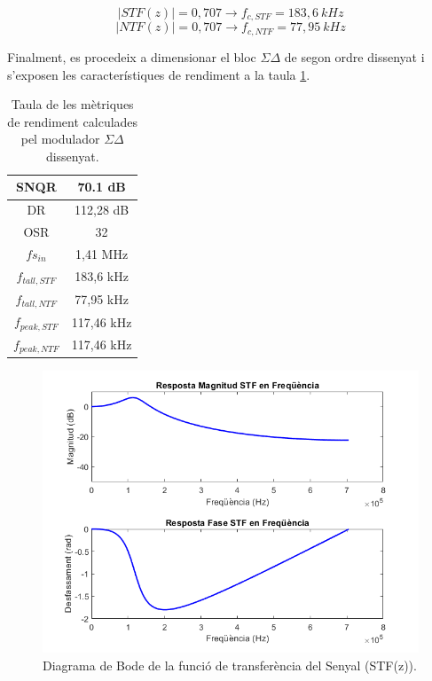 \begin{equation}\label{eq_fcorteSTF}
    \left| STF(z)\right| = 0,707 \longrightarrow f_{c,STF} = 183,6\ kHz
\end{equation}
\begin{equation}\label{eq_fcorteNTF}
    \left| NTF(z)\right| = 0,707 \longrightarrow f_{c,NTF} = 77,95\ kHz
\end{equation}
\par Finalment, es procedeix a dimensionar el bloc $\Sigma \Delta$ de segon ordre dissenyat i s'exposen les característiques de rendiment a la taula \ref{taula_SigmaDelta}. 

\begin{table}[H]
    \centering
    \begin{tabular}{ | c | c | }
    \hline
    \centering
    SNQR     &  70.1 dB\\ \hline
    \centering
    DR    &    112,28 dB \\ \hline
    \centering
    OSR    &    32 \\ \hline
    \centering
    $fs_{in}$   &    1,41 MHz \\ \hline
    \centering
    $f_{tall, STF}$    &   183,6 kHz\\ \hline
    \centering
    $f_{tall, NTF}$    &   77,95 kHz\\ \hline
    \centering
    $f_{peak, STF}$    &   117,46 kHz\\ \hline
    \centering
    $f_{peak, NTF}$    &   117,46 kHz\\ \hline
    \end{tabular}
    \caption{Taula de les mètriques de rendiment calculades pel modulador $\Sigma \Delta$ dissenyat.}
    \label{taula_SigmaDelta}
\end{table}
\begin{figure}[H]
    \centering
    \includegraphics[width=0.5\linewidth]{Images/bodeSTFMOD2.png}
    \caption{Diagrama de Bode de la funció de transferència del Senyal (STF(z)).}
    \label{figbodeSTF}
\end{figure}

